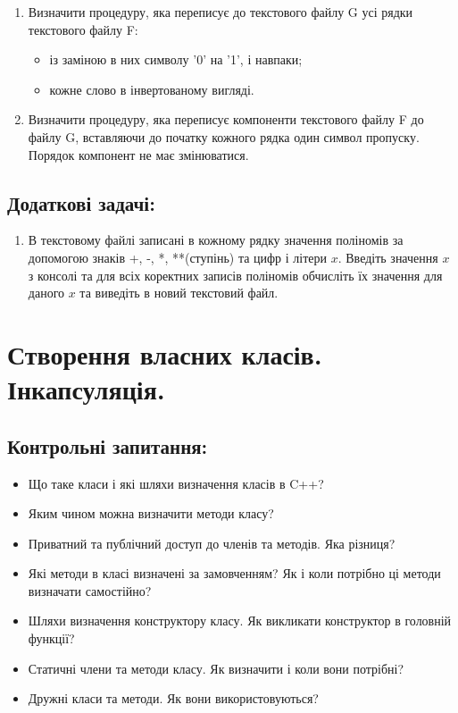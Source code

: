 \documentclass[a5paper,titlepage,openany,twoside,
]
{book_unv}%
\begin{document}
\begin{enumerate}
\item
Визначити процедуру, яка переписує до текстового файлу G усі 
рядки текстового файлу F:
\begin{itemize}
\item із заміною в них символу '0' на '1', і навпаки;
\item кожне слово в інвертованому вигляді.
\end{itemize}

\item
Визначити процедуру, яка переписує компоненти текстового 
файлу F до файлу G, вставляючи до початку кожного рядка один символ пропуску.
Порядок компонент не має змінюватися.
\end{enumerate}


\section{Додаткові задачі:}

\begin{enumerate}
\def\labelenumi{\arabic{enumi})}
\setcounter{enumi}{27}
\item
  В текстовому файлі записані в кожному рядку значення поліномів за
  допомогою знаків +, -, *, **(ступінь) та цифр і літери $x$. Введіть
  значення $x$ з консолі та для всіх коректних записів поліномів обчисліть
  їх значення для даного $x$ та виведіть в новий текстовий файл.

\end{enumerate}



\chapter{Створення власних класів. Інкапсуляція.}
%

\section{Контрольні запитання:}
\begin{itemize}
\item
Що таке класи і які шляхи визначення класів в C++?
\item
Яким чином можна визначити методи класу?
\item
Приватний та публічний доступ до членів та методів. Яка різниця?
\item
Які методи в класі визначені за замовченням? Як і коли потрібно ці
методи визначати самостійно?
\item 
Шляхи визначення конструктору класу. Як викликати конструктор в
головній функції?
\item
Статичні члени та методи класу. Як визначити і коли вони потрібні?
\item 
Дружні класи та методи. Як вони використовуються?
\end{itemize}
\end{document}
